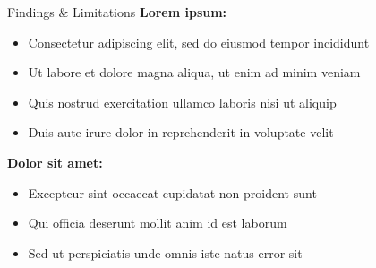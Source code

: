 \begin{block}{Findings \& Limitations}
\textbf{Lorem ipsum:}
\begin{itemize}
    \item Consectetur adipiscing elit, sed do eiusmod tempor incididunt
    \item Ut labore et dolore magna aliqua, ut enim ad minim veniam
    \item Quis nostrud exercitation ullamco laboris nisi ut aliquip
    \item Duis aute irure dolor in reprehenderit in voluptate velit
\end{itemize}

\vspace{0.3em}
\textbf{Dolor sit amet:}
\begin{itemize}
    \item Excepteur sint occaecat cupidatat non proident sunt
    \item Qui officia deserunt mollit anim id est laborum
    \item Sed ut perspiciatis unde omnis iste natus error sit
\end{itemize}
\end{block}
